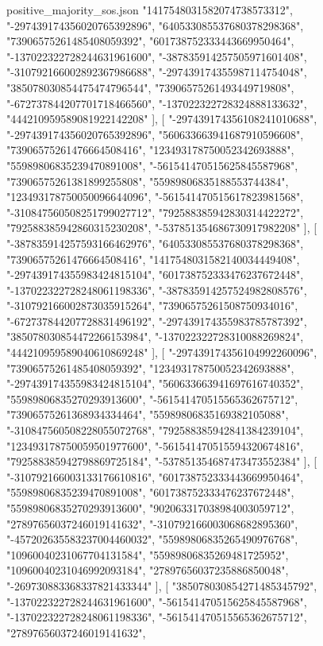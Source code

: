 \begin{filecontents*}[overwrite]{positive_majority_sos.json}
    "1417548031582074738573312",
    "-297439174356020765392896",
    "640533085537680378298368",
    "73906575261485408059392",
    "601738752333443669950464",
    "-137022322728244631961600",
    "-387835914257505971601408",
    "-310792166002892367986688",
    "-297439174355987114754048",
    "385078030854475474796544",
    "73906575261493449719808",
    "-672737844207701718466560",
    "-137022322728324888133632",
    "444210959589081922142208"
   ],
   [
    "-297439174356108241010688",
    "-297439174356020765392896",
    "560633663941687910596608",
    "73906575261476664508416",
    "123493178750052342693888",
    "55989806835239470891008",
    "-561541470515625845587968",
    "73906575261381899255808",
    "55989806835188553744384",
    "123493178750050096644096",
    "-561541470515617823981568",
    "-310847560508251799027712",
    "792588385942830314422272",
    "792588385942860315230208",
    "-537851354686730917982208"
   ],
   [
    "-387835914257593166462976",
    "640533085537680378298368",
    "73906575261476664508416",
    "1417548031582140034449408",
    "-297439174355983424815104",
    "601738752333476237672448",
    "-137022322728248061198336",
    "-387835914257524982808576",
    "-310792166002873035915264",
    "73906575261508750934016",
    "-672737844207728831496192",
    "-297439174355983785787392",
    "385078030854472266153984",
    "-137022322728310088269824",
    "444210959589040610869248"
   ],
   [
    "-297439174356104992260096",
    "73906575261485408059392",
    "123493178750052342693888",
    "-297439174355983424815104",
    "560633663941697616740352",
    "55989806835270293913600",
    "-561541470515565362675712",
    "73906575261368934334464",
    "55989806835169382105088",
    "-310847560508228055072768",
    "792588385942841384239104",
    "123493178750059501977600",
    "-561541470515594320674816",
    "792588385942798869725184",
    "-537851354687473473552384"
   ],
   [
    "-310792166003133176610816",
    "601738752333443669950464",
    "55989806835239470891008",
    "601738752333476237672448",
    "55989806835270293913600",
    "902063317038984003059712",
    "27897656037246019141632",
    "-310792166003068682895360",
    "-457202635583237004460032",
    "55989806835265490976768",
    "10960040231067704131584",
    "55989806835269481725952",
    "10960040231046992093184",
    "27897656037235886850048",
    "-269730883368337821433344"
   ],
   [
    "385078030854271485345792",
    "-137022322728244631961600",
    "-561541470515625845587968",
    "-137022322728248061198336",
    "-561541470515565362675712",
    "27897656037246019141632",

\end{filecontents*}
